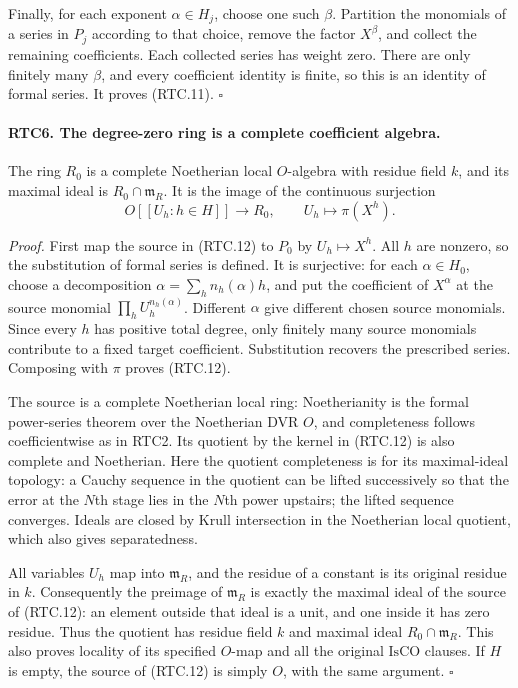 \documentclass[11pt,a4paper]{article}
\numberwithin{equation}{section}
\theoremstyle{remark}\newtheorem{remark}[theorem]{Remark}
\begin{document}
Finally, for each exponent \(\alpha\in H_j\), choose one such
\(\beta\).  Partition the monomials of a series in \(P_j\)
according to that choice, remove the factor \(X^\beta\), and
collect the remaining coefficients.  Each collected series has
weight zero.  There are only finitely many \(\beta\), and every
coefficient identity is finite, so this is an identity of formal
series.  It proves (RTC.11). \hfill\(\square\)

\paragraph{RTC6. The degree-zero ring is a complete coefficient algebra.}
\label{claim:RTC6}
The ring \(R_0\) is a complete Noetherian local \(O\)-algebra
with residue field \(k\), and its maximal ideal is
\(R_0\cap\mathfrak m_R\).  It is the image of the continuous
surjection
\[
 O[[U_h:h\in H]]\longrightarrow R_0,
       \qquad U_h\longmapsto\pi(X^h).
                                                        \tag{RTC.12}
\]

\emph{Proof.}
First map the source in (RTC.12) to \(P_0\) by
\(U_h\mapsto X^h\).  All \(h\) are nonzero, so the substitution
of formal series is defined.  It is surjective: for each
\(\alpha\in H_0\), choose a decomposition
\(\alpha=\sum_h n_h(\alpha)h\), and put the coefficient of
\(X^\alpha\) at the source monomial
\(\prod_hU_h^{n_h(\alpha)}\).  Different \(\alpha\) give
different chosen source monomials.  Since every \(h\) has positive
total degree, only finitely many source monomials contribute to a
fixed target coefficient.  Substitution recovers the prescribed
series.  Composing with \(\pi\) proves (RTC.12).

The source is a complete Noetherian local ring: Noetherianity is
the formal power-series theorem over the Noetherian DVR \(O\),
and completeness follows coefficientwise as in RTC2.  Its quotient
by the kernel in (RTC.12) is also complete and Noetherian.  Here
the quotient completeness is for its maximal-ideal topology: a
Cauchy sequence in the quotient can be lifted successively so that
the error at the \(N\)th stage lies in the \(N\)th power upstairs;
the lifted sequence converges.  Ideals are closed by Krull
intersection in the Noetherian local quotient, which also gives
separatedness.

All variables \(U_h\) map into \(\mathfrak m_R\), and the
residue of a constant is its original residue in \(k\).
Consequently the preimage of \(\mathfrak m_R\) is exactly the
maximal ideal of the source of (RTC.12): an element outside that
ideal is a unit, and one inside it has zero residue.  Thus the
quotient has residue field \(k\) and maximal ideal
\(R_0\cap\mathfrak m_R\).  This also proves locality of its
specified \(O\)-map and all the original \(\mathrm{IsCO}\)
clauses.  If \(H\) is empty, the source of (RTC.12) is simply
\(O\), with the same argument. \hfill\(\square\)
\end{document}
